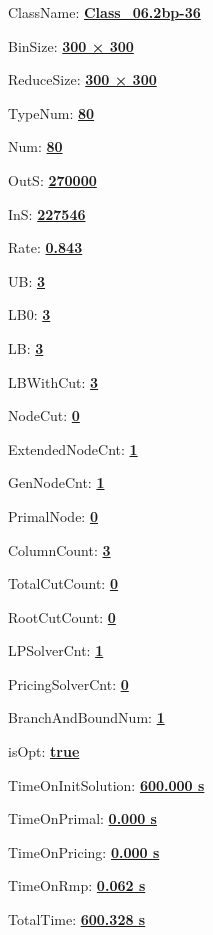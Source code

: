 \documentclass[11pt]{article}
\begin{document}
\pagestyle{empty}


ClassName: \underline{\textbf{Class_06.2bp-36}}
\par
BinSize: \underline{\textbf{300 × 300}}
\par
ReduceSize: \underline{\textbf{300 × 300}}
\par
TypeNum: \underline{\textbf{80}}
\par
Num: \underline{\textbf{80}}
\par
OutS: \underline{\textbf{270000}}
\par
InS: \underline{\textbf{227546}}
\par
Rate: \underline{\textbf{0.843}}
\par
UB: \underline{\textbf{3}}
\par
LB0: \underline{\textbf{3}}
\par
LB: \underline{\textbf{3}}
\par
LBWithCut: \underline{\textbf{3}}
\par
NodeCut: \underline{\textbf{0}}
\par
ExtendedNodeCnt: \underline{\textbf{1}}
\par
GenNodeCnt: \underline{\textbf{1}}
\par
PrimalNode: \underline{\textbf{0}}
\par
ColumnCount: \underline{\textbf{3}}
\par
TotalCutCount: \underline{\textbf{0}}
\par
RootCutCount: \underline{\textbf{0}}
\par
LPSolverCnt: \underline{\textbf{1}}
\par
PricingSolverCnt: \underline{\textbf{0}}
\par
BranchAndBoundNum: \underline{\textbf{1}}
\par
isOpt: \underline{\textbf{true}}
\par
TimeOnInitSolution: \underline{\textbf{600.000 s}}
\par
TimeOnPrimal: \underline{\textbf{0.000 s}}
\par
TimeOnPricing: \underline{\textbf{0.000 s}}
\par
TimeOnRmp: \underline{\textbf{0.062 s}}
\par
TotalTime: \underline{\textbf{600.328 s}}
\par
\newpage
\end{document}
